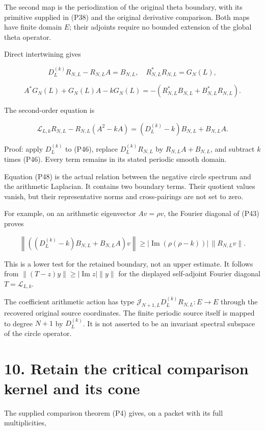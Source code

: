 \documentclass[
]{article}
\begin{document}
The second map is the periodization of the original theta boundary, with
its primitive supplied in (P38) and the original derivative comparison.
Both maps have finite domain \(E\); their adjoints require no bounded
extension of the global theta operator.

Direct intertwining gives

\[
D_L^{(k)}R_{N,L}-R_{N,L}A=B_{N,L},
\quad R_{N,L}^*R_{N,L}=G_N(L),
\tag{P46}
\]

\[
A^*G_N(L)+G_N(L)A-kG_N(L)
=-(R_{N,L}^*B_{N,L}+B_{N,L}^*R_{N,L}).
\tag{P47}
\]

The second-order equation is

\[
\boxed{\mathscr L_{L,k}R_{N,L}-R_{N,L}(A^2-kA)
=(D_L^{(k)}-k)B_{N,L}+B_{N,L}A.}
\tag{P48}
\]

Proof: apply \(D_L^{(k)}\) to (P46), replace \(D_L^{(k)}R_{N,L}\) by
\(R_{N,L}A+B_{N,L}\), and subtract \(k\) times (P46). Every term remains
in its stated periodic smooth domain.

Equation (P48) is the actual relation between the negative circle
spectrum and the arithmetic Laplacian. It contains two boundary terms.
Their quotient values vanish, but their representative norms and
cross-pairings are not set to zero.

For example, on an arithmetic eigenvector \(Av=\rho v\), the Fourier
diagonal of (P43) proves

\[
\left\|((D_L^{(k)}-k)B_{N,L}+B_{N,L}A)v\right\|
\ge |\operatorname{Im}(\rho(\rho-k))|\,\|R_{N,L}v\|.
\tag{P49}
\]

This is a lower test for the retained boundary, not an upper estimate.
It follows from \(\| (T-z)y\|\ge|\operatorname{Im}z|\|y\|\) for the
displayed self-adjoint Fourier diagonal \(T=\mathscr L_{L,k}\).

The coefficient arithmetic action has type
\(\mathcal J_{N+1,L}D_L^{(k)}R_{N,L}:E\to E\) through the recovered
original source coordinates. The finite periodic source itself is mapped
to degree \(N+1\) by \(D_L^{(k)}\). It is not asserted to be an
invariant spectral subspace of the circle operator.

\section{10. Retain the critical comparison kernel and its
cone}\label{retain-the-critical-comparison-kernel-and-its-cone}

The supplied comparison theorem (P4) gives, on a packet with its full
multiplicities,
\end{document}
